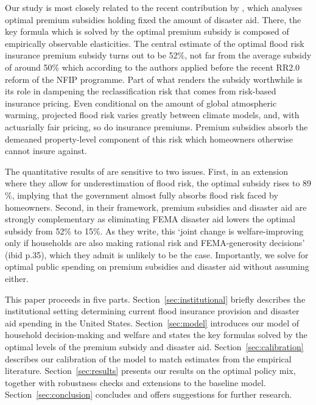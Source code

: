 \documentclass[12pt]{article}
\begin{document}
Our study is most closely related to the recent contribution by \cite{gruber2026optimal}, which analyses optimal premium subsidies holding fixed the amount of disaster aid. There, the key formula which is solved by the optimal premium subsidy is composed of empirically observable elasticities. The central estimate of the optimal flood risk insurance premium subsidy turns out to be 52$\%$, not far from the average subsidy of around 50$\%$ which according to the authors applied before the recent RR2.0 reform of the NFIP programme. Part of what renders the subsidy worthwhile is its role in dampening the reclassification risk that comes from risk-based insurance pricing. Even conditional on the amount of global atmospheric warming, projected flood risk varies greatly between climate models, and, with actuarially fair pricing, so do insurance premiums. Premium subsidies absorb the demeaned property-level component of this risk which homeowners otherwise cannot insure against.

The quantitative results of \cite{gruber2026optimal} are sensitive to two issues. First, in an extension where they allow for underestimation of flood risk, the optimal subsidy rises to 89$\%$, implying that the government almost fully absorbs flood risk faced by homeowners. Second, in their framework, premium subsidies and disaster aid are strongly complementary as eliminating FEMA disaster aid lowers the optimal subsidy from 52$\%$ to 15$\%$. As they write, this `joint change is welfare-improving only if households are also making rational risk and FEMA-generosity decisions' (ibid p.35), which they admit is unlikely to be the case. Importantly, we solve for  optimal public spending on premium subsidies and disaster aid without assuming either.

This paper proceeds in five parts. Section~\ref{sec:institutional} briefly describes the institutional setting determining current flood insurance provision and disaster aid spending in the United States. Section~\ref{sec:model} introduces our model of household decision-making and welfare and states the key formulas solved by the optimal levels of the premium subsidy and disaster aid. Section~\ref{sec:calibration} describes our calibration of the model to match estimates from the empirical literature. Section~\ref{sec:results} presents our results on the optimal policy mix, together with robustness checks and extensions to the baseline model. Section~\ref{sec:conclusion} concludes and offers suggestions for further research.
\end{document}

